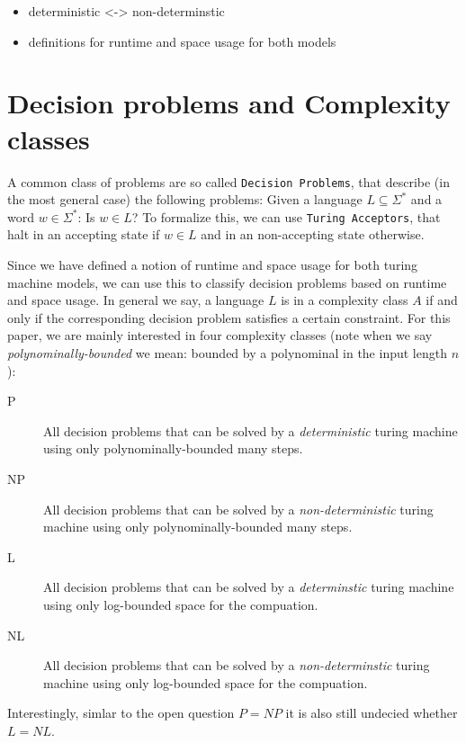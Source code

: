 \begin{itemize}
\item
  deterministic \textless{}-\textgreater{} non-determinstic
\item
  definitions for runtime and space usage for both models
\end{itemize}

\section{Decision problems and Complexity
classes}\label{decision-problems-and-complexity-classes}

A common class of problems are so called \texttt{Decision Problems},
that describe (in the most general case) the following problems: Given a
language $L \subseteq \Sigma^*$ and a word $w \in \Sigma^*$: Is
$w \in L$? To formalize this, we can use \texttt{Turing Acceptors}, that
halt in an accepting state if $w \in L$ and in an non-accepting state
otherwise.

Since we have defined a notion of runtime and space usage for both
turing machine models, we can use this to classify decision problems
based on runtime and space usage. In general we say, a language $L$ is
in a complexity class $A$ if and only if the corresponding decision
problem satisfies a certain constraint. For this paper, we are mainly
interested in four complexity classes (note when we say
\emph{polynominally-bounded} we mean: bounded by a polynominal in the
input length $n$):

\begin{description}
\item[P]
All decision problems that can be solved by a \emph{deterministic}
turing machine using only polynominally-bounded many steps.
\item[NP]
All decision problems that can be solved by a \emph{non-deterministic}
turing machine using only polynominally-bounded many steps.
\item[L]
All decision problems that can be solved by a \emph{determinstic} turing
machine using only log-bounded space for the compuation.
\item[NL]
All decision problems that can be solved by a \emph{non-determinstic}
turing machine using only log-bounded space for the compuation.
\end{description}

Interestingly, simlar to the open question $P = NP$ it is also still
undecied whether $L = NL$.

